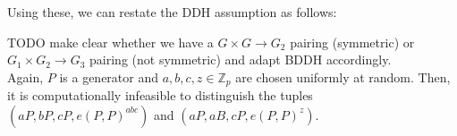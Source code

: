 Using these, we can restate the DDH assumption as follows: \cite{sahai_fuzzy_2005}

TODO make clear whether we have a $G \times G \rightarrow G_2$ pairing (symmetric) or $G_1 \times G_2 \rightarrow G_3$ pairing (not symmetric) and adapt BDDH accordingly.
\\

Again, $P$ is a generator and $a, b, c, z \in \mathbb{Z}_p$ are chosen uniformly at random. Then, it is computationally infeasible to distinguish the tuples $(aP, bP, cP, e(P,P)^{abc})$ and $(aP, aB, cP, e(P,P)^z)$.
